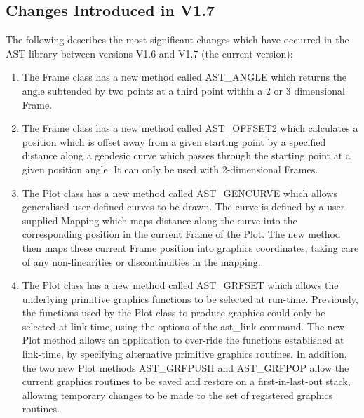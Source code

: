 \documentclass[twoside,11pt]{article}
\newcommand{\htmlref}[2]{#1}
\newcommand{\xlabel}[1]{}
\begin{document}
\subsection{\xlabel{changes}\xlabel{list_of_most_recent_changes}Changes
Introduced in V1.7}

The following describes the most significant changes which have
occurred in the AST library between versions V1.6 and V1.7 (the
current version):

\begin{enumerate}

\item The \htmlref{Frame}{Frame} class has a new method called 
\htmlref{AST\_ANGLE}{AST_ANGLE}
which returns the angle subtended by two points at a third point within a
2 or 3 dimensional Frame.

\item The Frame class has a new method called 
\htmlref{AST\_OFFSET2}{AST_OFFSET2}
which calculates a position which is offset away from a given starting
point by a specified distance along a geodesic curve which passes
through the starting point at a given position angle. It can only be used
with 2-dimensional Frames.

\item The \htmlref{Plot}{Plot} class has a new method called 
\htmlref{AST\_GENCURVE}{AST_GENCURVE}
which allows generalised user-defined curves to be drawn. The curve is
defined by a user-supplied \htmlref{Mapping}{Mapping} which maps distance along the curve
into the corresponding position in the current Frame of the Plot. The new
method then maps these current Frame position into graphics coordinates,
taking care of any non-linearities or discontinuities in the mapping.

\item The Plot class has a new method called 
\htmlref{AST\_GRFSET}{AST_GRFSET} 
which allows the underlying primitive graphics functions to be selected
at run-time. Previously, the functions used by the Plot class to produce
graphics could only be selected at link-time, using the options of the
\htmlref{ast\_link}{ast_link} command. The new Plot method allows an application to over-ride
the functions established at link-time, by specifying alternative
primitive graphics routines. In addition, the two new Plot methods
\htmlref{AST\_GRFPUSH}{AST_GRFPUSH} and \htmlref{AST\_GRFPOP}{AST_GRFPOP}
allow the current graphics routines to be saved and restore on a
first-in-last-out stack, allowing temporary changes to be made to the set
of registered graphics routines.


\end{enumerate}
\end{document}
